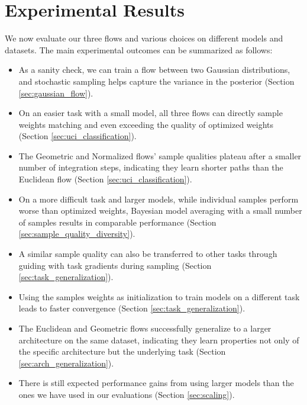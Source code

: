 
\chapter{Experimental Results}\label{chapter:results}

We now evaluate our three flows and various choices on different models and datasets. The main experimental outcomes can be summarized as follows:
\begin{itemize}
    \item As a sanity check, we can train a flow between two Gaussian distributions, and stochastic sampling helps capture the variance in the posterior (Section \ref{sec:gaussian_flow}).
    \item On an easier task with a small model, all three flows can directly sample weights matching and even exceeding the quality of optimized weights (Section \ref{sec:uci_classification}).
    \item The Geometric and Normalized flows' sample qualities plateau after a smaller number of integration steps, indicating they learn shorter paths than the Euclidean flow (Section \ref{sec:uci_classification}).
    \item On a more difficult task and larger models, while individual samples perform worse than optimized weights, Bayesian model averaging with a small number of samples results in comparable performance (Section \ref{sec:sample_quality_diversity}).
    \item A similar sample quality can also be transferred to other tasks through guiding with task gradients during sampling (Section \ref{sec:task_generalization}).
    \item Using the samples weights as initialization to train models on a different task leads to faster convergence (Section \ref{sec:task_generalization}).
    \item The Euclidean and Geometric flows successfully generalize to a larger architecture on the same dataset, indicating they learn properties not only of the specific architecture but the underlying task (Section \ref{sec:arch_generalization}).
    \item There is still expected performance gains from using larger models than the ones we have used in our evaluations (Section \ref{sec:scaling}).
\end{itemize}


